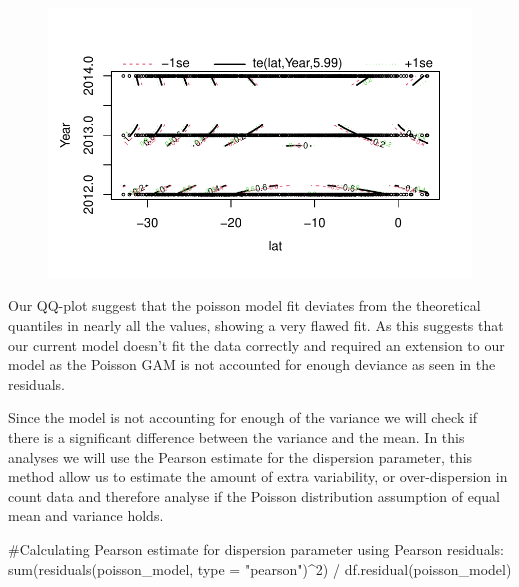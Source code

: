 \documentclass[
  letterpaper,
  DIV=11,
  numbers=noendperiod]{scrartcl}
\newenvironment{Shaded}{\begin{snugshade}}{\end{snugshade}}
\newcommand{\AttributeTok}[1]{\textcolor[rgb]{0.40,0.45,0.13}{#1}}
\newcommand{\CommentTok}[1]{\textcolor[rgb]{0.37,0.37,0.37}{#1}}
\newcommand{\DecValTok}[1]{\textcolor[rgb]{0.68,0.00,0.00}{#1}}
\newcommand{\FunctionTok}[1]{\textcolor[rgb]{0.28,0.35,0.67}{#1}}
\newcommand{\NormalTok}[1]{\textcolor[rgb]{0.00,0.23,0.31}{#1}}
\newcommand{\SpecialCharTok}[1]{\textcolor[rgb]{0.37,0.37,0.37}{#1}}
\newcommand{\StringTok}[1]{\textcolor[rgb]{0.13,0.47,0.30}{#1}}
\begin{document}
\begin{figure}[H]

{\centering \includegraphics{Group34Coursework_files/figure-pdf/unnamed-chunk-10-11.pdf}

}

\end{figure}

Our QQ-plot suggest that the poisson model fit deviates from the
theoretical quantiles in nearly all the values, showing a very flawed
fit. As this suggests that our current model doesn't fit the data
correctly and required an extension to our model as the Poisson GAM is
not accounted for enough deviance as seen in the residuals.

Since the model is not accounting for enough of the variance we will
check if there is a significant difference between the variance and the
mean. In this analyses we will use the Pearson estimate for the
dispersion parameter, this method allow us to estimate the amount of
extra variability, or over-dispersion in count data and therefore
analyse if the Poisson distribution assumption of equal mean and
variance holds.

\begin{Shaded}
\begin{Highlighting}[]
\CommentTok{\#Calculating Pearson estimate for dispersion parameter using Pearson residuals:}
\FunctionTok{sum}\NormalTok{(}\FunctionTok{residuals}\NormalTok{(poisson\_model, }\AttributeTok{type =} \StringTok{"pearson"}\NormalTok{)}\SpecialCharTok{\^{}}\DecValTok{2}\NormalTok{) }\SpecialCharTok{/} \FunctionTok{df.residual}\NormalTok{(poisson\_model)}
\end{Highlighting}
\end{Shaded}
\end{document}
